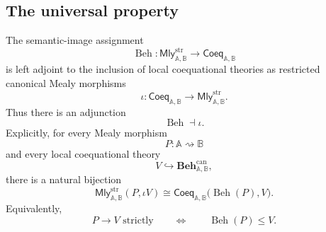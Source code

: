 \subsection{The universal property}
\label{subsec:universal-realization-universal-property}

\begin{theorem}
\label{thm:universal-realization-adjunction}
    The semantic-image assignment
    \[
        \operatorname{Beh}:
        \mathsf{Mly}^{\mathrm{str}}_{\mathbb A,\mathbb B}
        \longrightarrow
        \mathsf{Coeq}_{\mathbb A,\mathbb B}
    \]
    is left adjoint to the inclusion of local coequational theories as
    restricted canonical Mealy morphisms
    \[
        \iota:
        \mathsf{Coeq}_{\mathbb A,\mathbb B}
        \longrightarrow
        \mathsf{Mly}^{\mathrm{str}}_{\mathbb A,\mathbb B}.
    \]
    Thus there is an adjunction
    \[
        \operatorname{Beh}
        \dashv
        \iota .
    \]
    Explicitly, for every Mealy morphism
    \[
        P:\mathbb A\rightsquigarrow\mathbb B
    \]
    and every local coequational theory
    \[
        V\hookrightarrow
        \mathbf{Beh}^{\mathrm{can}}_{\mathbb A,\mathbb B},
    \]
    there is a natural bijection
    \[
        \mathsf{Mly}^{\mathrm{str}}_{\mathbb A,\mathbb B}
        (P,\iota V)
        \cong
        \mathsf{Coeq}_{\mathbb A,\mathbb B}
        \bigl(\operatorname{Beh}(P),V\bigr).
    \]
    Equivalently,
    \[
        P\to V
        \text{ strictly}
        \qquad\Longleftrightarrow\qquad
        \operatorname{Beh}(P)\leq V.
    \]
\end{theorem}

